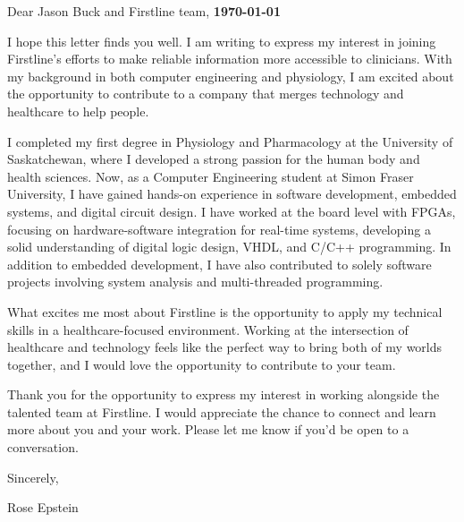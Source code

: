 \documentclass[letterpaper,11pt]{article}
\begin{document}
    \vspace*{10pt}
    \par Dear Jason Buck and Firstline team,  \hfill \textbf{\today}
    \vspace*{10pt}
    \par I hope this letter finds you well. I am writing to express my interest in joining Firstline's efforts to make reliable information more accessible to clinicians. 
    With my background in both computer engineering and physiology, I am excited about the opportunity to contribute to a company that merges technology and healthcare to help people.
    \vspace*{10pt}
    \par I completed my first degree in Physiology and Pharmacology at the University of Saskatchewan, where I developed a strong passion for the human body and health sciences. 
    Now, as a Computer Engineering student at Simon Fraser University, I have gained hands-on experience in software development, embedded systems, and digital circuit design. 
    I have worked at the board level with FPGAs, focusing on hardware-software integration for real-time systems, developing a solid understanding of digital logic design, VHDL, and C/C++ programming. 
    In addition to embedded development, I have also contributed to solely software projects involving system analysis and multi-threaded programming.
    \vspace*{10pt}
    \par What excites me most about Firstline is the opportunity to apply my technical skills in a healthcare-focused environment.
    Working at the intersection of healthcare and technology feels like the perfect way to bring both of my worlds together, and I would love the opportunity to contribute to your team.
    \vspace{10pt}
    \par Thank you for the opportunity to express my interest in working alongside the talented team at Firstline.
    I would appreciate the chance to connect and learn more about you and your work. Please let me know if you'd be open to a conversation.
    \vspace*{10pt}
    \par Sincerely,
    \par Rose Epstein
\end{document}
